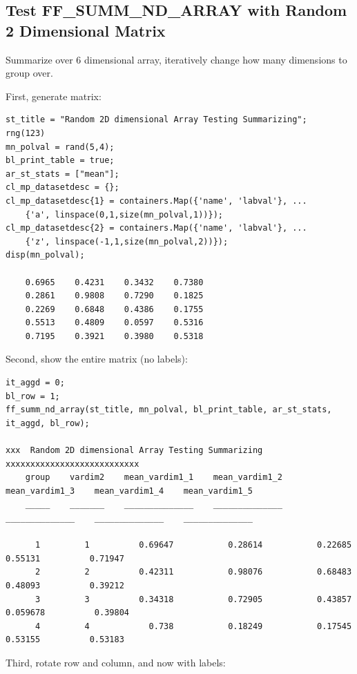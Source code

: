 \documentclass[
]{book}
\begin{document}
\hypertarget{test-ff_summ_nd_array-with-random-2-dimensional-matrix}{%
\subsection{Test FF\_SUMM\_ND\_ARRAY with Random 2 Dimensional Matrix}\label{test-ff_summ_nd_array-with-random-2-dimensional-matrix}}

Summarize over 6 dimensional array, iteratively change how many
dimensions to group over.

First, generate matrix:

\begin{verbatim}
st_title = "Random 2D dimensional Array Testing Summarizing";
rng(123)
mn_polval = rand(5,4);
bl_print_table = true;
ar_st_stats = ["mean"];
cl_mp_datasetdesc = {};
cl_mp_datasetdesc{1} = containers.Map({'name', 'labval'}, ...
    {'a', linspace(0,1,size(mn_polval,1))});
cl_mp_datasetdesc{2} = containers.Map({'name', 'labval'}, ...
    {'z', linspace(-1,1,size(mn_polval,2))});
disp(mn_polval);

    0.6965    0.4231    0.3432    0.7380
    0.2861    0.9808    0.7290    0.1825
    0.2269    0.6848    0.4386    0.1755
    0.5513    0.4809    0.0597    0.5316
    0.7195    0.3921    0.3980    0.5318
\end{verbatim}

Second, show the entire matrix (no labels):

\begin{verbatim}
it_aggd = 0; 
bl_row = 1; 
ff_summ_nd_array(st_title, mn_polval, bl_print_table, ar_st_stats, it_aggd, bl_row);

xxx  Random 2D dimensional Array Testing Summarizing  xxxxxxxxxxxxxxxxxxxxxxxxxxx
    group    vardim2    mean_vardim1_1    mean_vardim1_2    mean_vardim1_3    mean_vardim1_4    mean_vardim1_5
    _____    _______    ______________    ______________    ______________    ______________    ______________

      1         1          0.69647           0.28614           0.22685            0.55131          0.71947    
      2         2          0.42311           0.98076           0.68483            0.48093          0.39212    
      3         3          0.34318           0.72905           0.43857           0.059678          0.39804    
      4         4            0.738           0.18249           0.17545            0.53155          0.53183    
\end{verbatim}

Third, rotate row and column, and now with labels:
\end{document}
